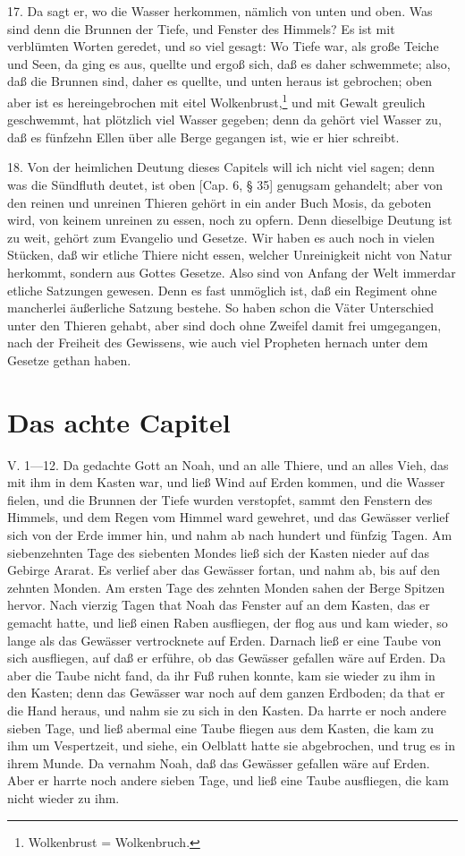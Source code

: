 17. Da sagt er, wo die Wasser herkommen, nämlich von unten und oben. Was sind denn die Brunnen der Tiefe, und Fenster des Himmels? Es ist mit verblümten Worten geredet, und so viel gesagt: Wo Tiefe war, als große Teiche und Seen, da ging es aus, quellte und ergoß sich, daß es daher schwemmete; also, daß die Brunnen sind, daher es quellte, und unten heraus ist gebrochen; oben aber ist es hereingebrochen mit eitel Wolkenbrust,\footnote{Wolkenbrust = Wolkenbruch.} und mit Gewalt greulich geschwemmt, hat plötzlich viel Wasser gegeben; denn da gehört viel Wasser zu, daß es fünfzehn Ellen über alle Berge gegangen ist, wie er hier schreibt.

18. Von der heimlichen Deutung dieses Capitels will ich nicht viel sagen; denn was die Sündfluth deutet, ist oben [Cap. 6, § 35] genugsam gehandelt; aber von den reinen und unreinen Thieren gehört in ein ander Buch Mosis, da geboten wird, von keinem unreinen zu essen, noch zu opfern. Denn dieselbige Deutung ist zu weit, gehört zum Evangelio und Gesetze. Wir haben es auch noch in vielen Stücken, daß wir etliche Thiere nicht essen, welcher Unreinigkeit nicht von Natur herkommt, sondern aus Gottes Gesetze. Also sind von Anfang der Welt immerdar etliche Satzungen gewesen. Denn es fast unmöglich ist, daß ein Regiment ohne mancherlei äußerliche Satzung bestehe. So haben schon die Väter Unterschied unter den Thieren gehabt, aber sind doch ohne Zweifel damit frei umgegangen, nach der Freiheit des Gewissens, wie auch viel Propheten hernach unter dem Gesetze gethan haben.

\section{Das achte Capitel}

V. 1—12. Da gedachte Gott an Noah, und an alle Thiere, und an alles Vieh, das mit ihm in dem Kasten war, und ließ Wind auf Erden kommen, und die Wasser fielen, und die Brunnen der Tiefe wurden verstopfet, sammt den Fenstern des Himmels, und dem Regen vom Himmel ward gewehret, und das Gewässer verlief sich von der Erde immer hin, und nahm ab nach hundert und fünfzig Tagen. Am siebenzehnten Tage des siebenten Mondes ließ sich der Kasten nieder auf das Gebirge Ararat. Es verlief aber das Gewässer fortan, und nahm ab, bis auf den zehnten Monden. Am ersten Tage des zehnten Monden sahen der Berge Spitzen hervor. Nach vierzig Tagen that Noah das Fenster auf an dem Kasten, das er gemacht hatte, und ließ einen Raben ausfliegen, der flog aus und kam wieder, so lange als das Gewässer vertrocknete auf Erden. Darnach ließ er eine Taube von sich ausfliegen, auf daß er erführe, ob das Gewässer gefallen wäre auf Erden. Da aber die Taube nicht fand, da ihr Fuß ruhen konnte, kam sie wieder zu ihm in den Kasten; denn das Gewässer war noch auf dem ganzen Erdboden; da that er die Hand heraus, und nahm sie zu sich in den Kasten. Da harrte er noch andere sieben Tage, und ließ abermal eine Taube fliegen aus dem Kasten, die kam zu ihm um Vespertzeit, und siehe, ein Oelblatt hatte sie abgebrochen, und trug es in ihrem Munde. Da vernahm Noah, daß das Gewässer gefallen wäre auf Erden. Aber er harrte noch andere sieben Tage, und ließ eine Taube ausfliegen, die kam nicht wieder zu ihm.


